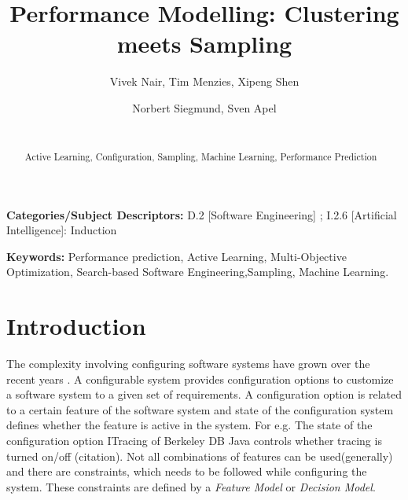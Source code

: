 \documentclass{sig-alternative}
\begin{document}
\title{ Performance Modelling: Clustering meets Sampling}
\author{
        \alignauthor Vivek Nair, Tim Menzies, Xipeng Shen 
    \and  
        \alignauthor Norbert Siegmund, Sven Apel \\
        \\
       }

\maketitle 
\thispagestyle{plain}
\pagestyle{plain}
\begin{abstract}
Active Learning, Configuration, Sampling, Machine Learning, Performance Prediction


\end{abstract}

\vspace{1mm}
\noindent
{\bf Categories/Subject Descriptors:} 
D.2 [Software Engineering] ;
I.2.6 [Artificial Intelligence]: Induction

 
\vspace{1mm}
\noindent
{\bf Keywords:} Performance prediction, Active Learning, 
Multi-Objective Optimization,
Search-based Software Engineering,Sampling, Machine Learning.

 
 
\section{Introduction}
 The complexity involving configuring software systems have grown over the recent years \cite{berger2013study}. A configurable system provides configuration options to customize a software system to a given set of requirements. A configuration option is related to a certain feature of the software system and state of the configuration system defines whether the feature is  active in the system. For e.g. The state of the configuration option ITracing of  Berkeley DB Java controls whether tracing is turned on/off (citation). Not all combinations of features can be used(generally) and there are constraints, which needs to be followed while configuring the system. These constraints are defined by a \textit{Feature Model}\cite{kang1990feature} or \textit{Decision Model}\cite{schmid2011comparison}. 
 
\end{document}
